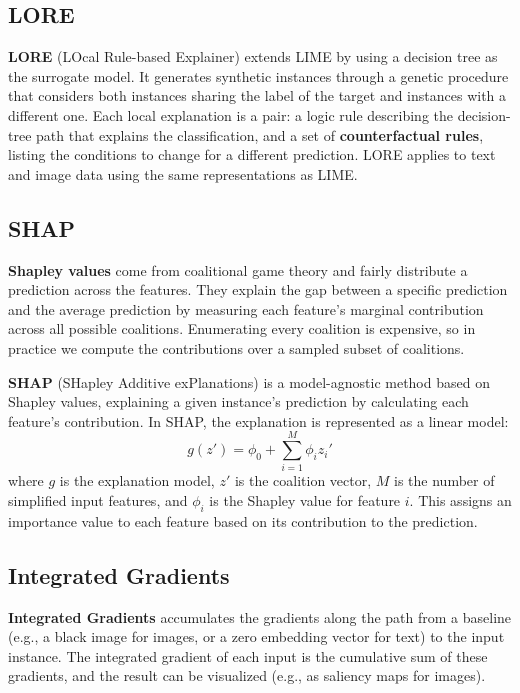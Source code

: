 \subsection{LORE}
\textbf{LORE} (LOcal Rule-based Explainer) extends LIME by using a decision tree as the surrogate model. It generates synthetic instances through a genetic procedure that considers both instances sharing the label of the target and instances with a different one. Each local explanation is a pair: a logic rule describing the decision-tree path that explains the classification, and a set of \textbf{counterfactual rules}, listing the conditions to change for a different prediction. LORE applies to text and image data using the same representations as LIME.

\subsection{SHAP}
\textbf{Shapley values} come from coalitional game theory and fairly distribute a prediction across the features. They explain the gap between a specific prediction and the average prediction by measuring each feature's marginal contribution across all possible coalitions. Enumerating every coalition is expensive, so in practice we compute the contributions over a sampled subset of coalitions.

\textbf{SHAP} (SHapley Additive exPlanations) is a model-agnostic method based on Shapley values, explaining a given instance's prediction by calculating each feature's contribution. In SHAP, the explanation is represented as a linear model:
\begin{equation*}
    g(z') = \phi_0 + \sum_{i=1}^M \phi_i z_i'
\end{equation*}
where $g$ is the explanation model, $z'$ is the coalition vector, $M$ is the number of simplified input features, and $\phi_i$ is the Shapley value for feature $i$. This assigns an importance value to each feature based on its contribution to the prediction.

\subsection{Integrated Gradients}
\textbf{Integrated Gradients} accumulates the gradients along the path from a baseline (e.g., a black image for images, or a zero embedding vector for text) to the input instance. The integrated gradient of each input is the cumulative sum of these gradients, and the result can be visualized (e.g., as saliency maps for images).

